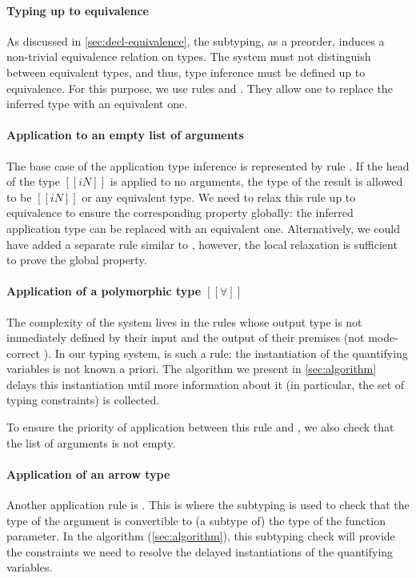 \paragraph*{Typing up to equivalence}
  As discussed in \cref{sec:decl-equivalence}, the subtyping, as a preorder, 
  induces a non-trivial equivalence relation on types. 
  The system must not distinguish between equivalent types,
  and thus, type inference must be defined up to equivalence. 
  For this purpose, we use rules   
  and .
  They allow one to replace the inferred type with an equivalent one.  

\paragraph*{Application to an empty list of arguments}
  The base case of the application type inference is 
  represented by rule .
  If the head of the type $[[iN]]$ is applied to no arguments, 
  the type of the result is allowed to be $[[iN]]$ or any 
  equivalent type. We need to relax this rule up to equivalence
  to ensure the corresponding property globally:
  the inferred application type can be replaced with an equivalent one.
  Alternatively, we could have added a separate rule similar to 
  , however, 
  the local relaxation is sufficient to prove the global property.

\paragraph*{Application of a polymorphic type $[[∀]]$}
  The complexity of the system lives in the rules whose output type is not
  immediately defined by their input and the output of their premises (\aka not
  mode-correct \cite{dunfield2020:bidirectional}). In our typing system,
   is such a rule: the instantiation of the
  quantifying variables is not known a priori. The algorithm we present in
  \cref{sec:algorithm} delays this instantiation until more information about it
  (in particular, the set of typing constraints) is collected.

  To ensure the priority of application between this rule and 
  , we also check that 
  the list of arguments is not empty.

\paragraph*{Application of an arrow type}
  Another application rule is .
  This is where the subtyping is used to check that the type of the argument
  is convertible to (a subtype of) the type of the function parameter.
  In the algorithm (\cref{sec:algorithm}), this subtyping check will provide the constraints
  we need to resolve the delayed instantiations of the quantifying variables.

